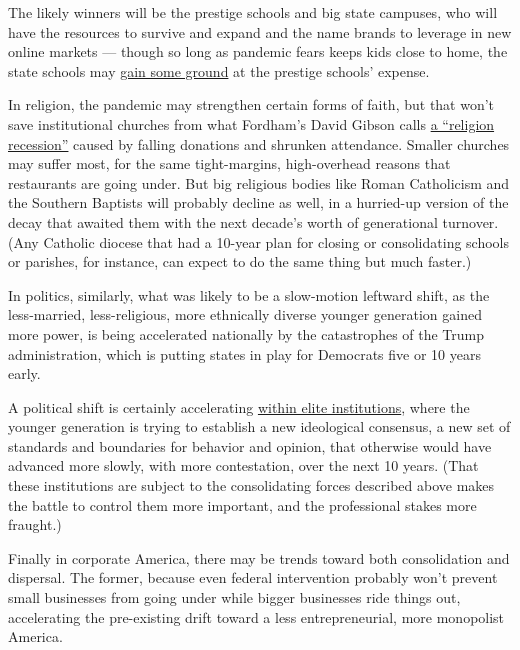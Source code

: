 The likely winners will be the prestige schools and big state campuses,
who will have the resources to survive and expand and the name brands to
leverage in new online markets --- though so long as pandemic fears
keeps kids close to home, the state schools may
\href{https://www.nytimes.com/2020/06/22/us/coronavirus-universities-brain-drain.html?searchResultPosition=1}{gain
some ground} at the prestige schools' expense.

In religion, the pandemic may strengthen certain forms of faith, but
that won't save institutional churches from what Fordham's David Gibson
calls
\href{https://religionandpolitics.org/2020/06/23/the-coming-religion-recession/}{a
``religion recession''} caused by falling donations and shrunken
attendance. Smaller churches may suffer most, for the same
tight-margins, high-overhead reasons that restaurants are going under.
But big religious bodies like Roman Catholicism and the Southern
Baptists will probably decline as well, in a hurried-up version of the
decay that awaited them with the next decade's worth of generational
turnover. (Any Catholic diocese that had a 10-year plan for closing or
consolidating schools or parishes, for instance, can expect to do the
same thing but much faster.)

In politics, similarly, what was likely to be a slow-motion leftward
shift, as the less-married, less-religious, more ethnically diverse
younger generation gained more power, is being accelerated nationally by
the catastrophes of the Trump administration, which is putting states in
play for Democrats five or 10 years early.

A political shift is certainly accelerating
\href{https://www.nytimes.com/2020/06/12/opinion/nyt-tom-cotton-oped-liberalism.html}{within
elite institutions}, where the younger generation is trying to establish
a new ideological consensus, a new set of standards and boundaries for
behavior and opinion, that otherwise would have advanced more slowly,
with more contestation, over the next 10 years. (That these institutions
are subject to the consolidating forces described above makes the battle
to control them more important, and the professional stakes more
fraught.)

Finally in corporate America, there may be trends toward both
consolidation and dispersal. The former, because even federal
intervention probably won't prevent small businesses from going under
while bigger businesses ride things out, accelerating the pre-existing
drift toward a less entrepreneurial, more monopolist America.

